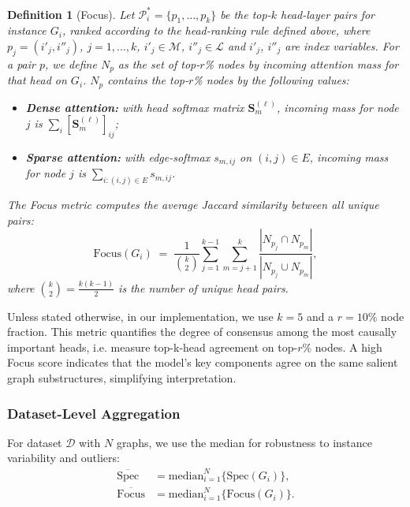 \documentclass[lettersize,journal]{IEEEtran}
\newtheorem{definition}{Definition}
\begin{document}
\begin{definition}[Focus] 

Let $\mathcal{P}_i^* = \{p_1,\dots,p_k\}$ be the top-$k$ head-layer pairs for instance $G_i$, ranked according to the head-ranking rule defined above, where $p_j=(i'_j,i''_j)$, $j=1,...,k$, $i'_j \in \mathcal{M}$, $i''_j \in \mathcal{L}$ and $i'_j$, $i''_j$ are index variables.  For a pair $p$, we define $N_{p}$ as the set of \emph{top-$r$\% nodes by incoming attention mass} for that head on $G_i$. $N_{p}$ contains the {top-$r$}\%  nodes by the following values:
\begin{itemize}
    \item \textbf{Dense attention:} with head softmax matrix $\mathbf{S}^{(\ell)}_{m}$, incoming mass for node $j$ is $\sum_{i} [\mathbf{S}^{(\ell)}_{m}]_{ij}$;
    \item \textbf{Sparse attention:} with edge-softmax $s_{m,ij}$ on $(i,j)\in E$, incoming mass for node $j$ is $\sum_{i:(i,j)\in E} s_{m,ij}$.  
\end{itemize}
The Focus metric computes the average Jaccard similarity between all unique pairs:
\begin{equation}
\text{Focus}(G_i) \;=\; \frac{1}{\binom{k}{2}} \sum_{j=1}^{k-1} \sum_{m=j+1}^{k} 
\frac{|N_{p_j} \cap N_{p_m}|}{|N_{p_j} \cup N_{p_m}|},
\end{equation}
where $\binom{k}{2} = \tfrac{k(k-1)}{2}$ is the number of unique head pairs.
\end{definition}

Unless stated otherwise, in our implementation, we use $k{=}5$ and a $r=10\%$ node fraction. This metric quantifies the degree of consensus among the most causally important heads, i.e. measure top-k-head agreement on top-$r\%$
nodes. A high Focus score indicates that the model's key components agree on the same salient graph substructures, simplifying interpretation.

\subsubsection{Dataset-Level Aggregation}
For dataset $\mathcal{D}$ with $N$ graphs, we use the median for robustness to instance variability and outliers:
\begin{align}
\overline{\mathrm{Spec}} &= \mathrm{median}_{i=1}^{N} \{\mathrm{Spec}(G_i)\}, \\
\overline{\mathrm{Focus}} &= \mathrm{median}_{i=1}^{N} \{\mathrm{Focus}(G_i)\}.
\end{align}
\end{document}
